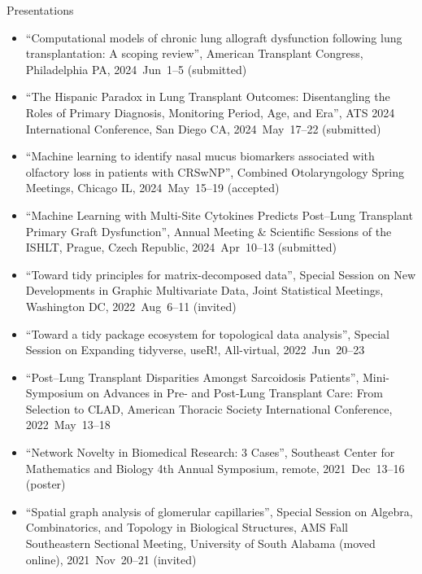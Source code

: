 \documentclass[10pt,a4paper]{article}
\begin{document}
\vspace{.25cm}
{\sc Presentations}
\begin{itemize}[label=$\circ$,nolistsep]
\item
``Computational models of chronic lung allograft dysfunction following lung transplantation: A scoping review'', American Transplant Congress, Philadelphia PA, 2024~Jun~1--5 (submitted)
\item
``The Hispanic Paradox in Lung Transplant Outcomes: Disentangling the Roles of Primary Diagnosis, Monitoring Period, Age, and Era'', ATS 2024 International Conference, San Diego CA, 2024~May~17--22 (submitted)
\item
``Machine learning to identify nasal mucus biomarkers associated with olfactory loss in patients with CRSwNP'', Combined Otolaryngology Spring Meetings, Chicago IL, 2024~May~15--19 (accepted)
\item
``Machine Learning with Multi-Site Cytokines Predicts Post–Lung Transplant Primary Graft Dysfunction'', Annual Meeting \& Scientific Sessions of the ISHLT, Prague, Czech Republic, 2024~Apr~10--13 (submitted)
\item
``Toward tidy principles for matrix-decomposed data'', Special Session on New Developments in Graphic Multivariate Data, Joint Statistical Meetings, Washington DC, 2022~Aug~6--11 (invited)
\item
``Toward a tidy package ecosystem for topological data analysis'', Special Session on Expanding {\sffamily tidyverse}, useR!, All-virtual, 2022~Jun~20--23
\item
``Post--Lung Transplant Disparities Amongst Sarcoidosis Patients'', Mini-Symposium on Advances in Pre- and Post-Lung Transplant Care: From Selection to CLAD, American Thoracic Society International Conference, 2022~May~13--18
\item
``Network Novelty in Biomedical Research: 3 Cases'', Southeast Center for Mathematics and Biology 4th Annual Symposium, remote, 2021~Dec~13--16 (poster)
\item
``Spatial graph analysis of glomerular capillaries'', Special Session on Algebra, Combinatorics, and Topology in Biological Structures, AMS Fall Southeastern Sectional Meeting, University of South Alabama (moved online), 2021~Nov~20--21 (invited)

\end{itemize}
\end{document}

